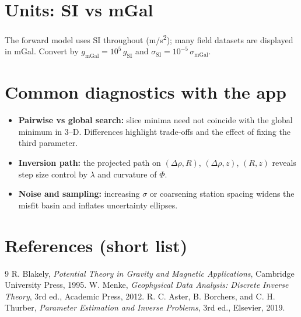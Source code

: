 \documentclass[11pt,a4paper]{article}
\begin{document}
\section*{Units: SI vs mGal}
The forward model uses SI throughout (\si{m/s^2}); many field datasets are displayed in mGal. Convert by $g_{\mathrm{mGal}} = 10^5\,g_{\mathrm{SI}}$ and $\sigma_{\mathrm{SI}} = 10^{-5}\,\sigma_{\mathrm{mGal}}$.

\section*{Common diagnostics with the app}
\begin{itemize}[nosep]
  \item \textbf{Pairwise vs global search:} slice minima need not coincide with the global minimum in 3--D. Differences highlight trade-offs and the effect of fixing the third parameter.
  \item \textbf{Inversion path:} the projected path on $(\Delta\rho,R)$, $(\Delta\rho,z)$, $(R,z)$ reveals step size control by $\lambda$ and curvature of $\Phi$.
  \item \textbf{Noise and sampling:} increasing $\sigma$ or coarsening station spacing widens the misfit basin and inflates uncertainty ellipses.
\end{itemize}

\section*{References (short list)}
\begin{thebibliography}{9}
 R. Blakely, \textit{Potential Theory in Gravity and Magnetic Applications}, Cambridge University Press, 1995.
 W. Menke, \textit{Geophysical Data Analysis: Discrete Inverse Theory}, 3rd ed., Academic Press, 2012.
 R. C. Aster, B. Borchers, and C. H. Thurber, \textit{Parameter Estimation and Inverse Problems}, 3rd ed., Elsevier, 2019.
\end{thebibliography}
\end{document}
